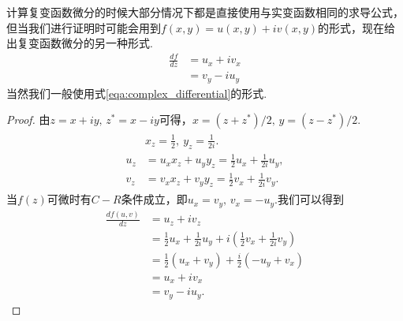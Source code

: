         \begin{proposition}\label{prop:complex_function_differential}
            计算复变函数微分的时候大部分情况下都是直接使用与实变函数相同的求导公式，但当我们进行证明时可能会用到$f(x,y)=u(x,y)+iv(x,y)$的形式，现在给出复变函数微分的另一种形式.
            \begin{align}
                \frac{d f}{d z} &= u_x + iv_x \label{eqa:complex_differential}\\
                &= v_y - iu_y
            \end{align}
            当然我们一般使用式\ref{eqa:complex_differential}的形式.
        \end{proposition}
        \begin{proof}
            由$z=x+iy,\,z^*=x-iy$可得，$x=(z+z^*)/2,\,y=(z-z^*)/2$.
            \begin{align}
                \begin{split}
                &x_z=\frac12,\ y_z=\frac1{2i}.\\
                u_z&=u_x x_z + u_y y_z = \frac12 u_x + \frac1{2i} u_y,\\
                v_z&=v_x x_z + v_y y_z = \frac12 v_x + \frac1{2i} v_y.
                \end{split}
            \end{align}
            当$f(z)$可微时有$C-R$条件成立，即$u_x=v_y,\,v_x=-u_y$.我们可以得到
            \begin{align*}
                \frac{df(u,v)}{dz}&=u_z+iv_z\\
                &=\frac12 u_x + \frac1{2i} u_y+i\left(\frac12 v_x + \frac1{2i} v_y\right)\\
                &=\frac12 (u_x + v_y) + \frac i2 (- u_y + v_x)\\
                &=u_x + iv_x\\
                &=v_y - iu_y.
            \end{align*}
        \end{proof}

